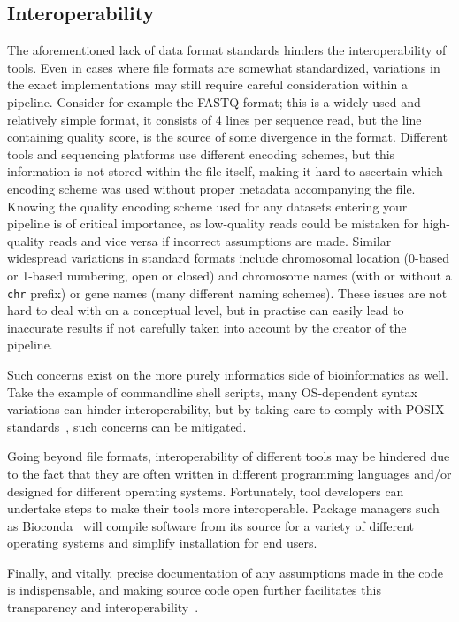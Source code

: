 \begin{justify}
\subsection{Interoperability}

The aforementioned lack of data format standards hinders the interoperability of tools. Even in cases where file formats are somewhat standardized, variations in the exact implementations may still require careful consideration within a pipeline. Consider for example the FASTQ format; this is a widely used and relatively simple format, it consists of 4 lines per sequence read, but the line containing quality score, is the source of some divergence in the format. Different tools and sequencing platforms use different encoding schemes, but this information is not stored within the file itself, making it hard to ascertain which encoding scheme was used without proper metadata accompanying the file. Knowing the quality encoding scheme used for any datasets entering your pipeline is of critical importance, as low-quality reads could be mistaken for high-quality reads and vice versa if incorrect assumptions are made. Similar widespread variations in standard formats include chromosomal location (0-based or 1-based numbering, open or closed) and chromosome names (with or without a \verb+chr+ prefix) or gene names (many different naming schemes). These issues are not hard to deal with on a conceptual level, but in practise can easily lead to inaccurate results if not carefully taken into account by the creator of the pipeline.

Such concerns exist on the more purely informatics side of bioinformatics as well. Take the example of commandline shell scripts, many OS-dependent syntax variations can hinder interoperability, but by taking care to comply with POSIX standards~\cite{walli1995posix}, such concerns can be mitigated.

Going beyond file formats, interoperability of different tools may be hindered due to the fact that they are often written in different programming languages and/or designed for different operating systems. Fortunately, tool developers can undertake steps to make their tools more interoperable. Package managers such as Bioconda~\cite{gruning2017bioconda} will compile software from its source for a variety of different operating systems and simplify installation for end users.

Finally, and vitally, precise documentation of any assumptions made in the code is indispensable, and making source code open further facilitates this transparency and interoperability~\cite{ince2012case}.



\end{justify}
